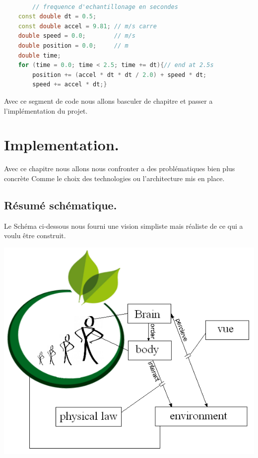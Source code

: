 \documentclass[a4paper,11pt]{article}
\begin{document}
\begin{lstlisting}[language=c++, style=eclipse, frame=single]   

        // frequence d'echantillonage en secondes
    const double dt = 0.5;     	
    const double accel = 9.81; // m/s carre
    double speed = 0.0;        // m/s
    double position = 0.0;     // m
    double time;
    for (time = 0.0; time < 2.5; time += dt){// end at 2.5s
        position += (accel * dt * dt / 2.0) + speed * dt;
        speed += accel * dt;} 
\end{lstlisting}

\vspace{0.25cm}

Avec ce segment de code nous allons basculer de chapitre et passer a l'implémentation du projet.

\newpage

\section{Implementation.}

Avec ce chapitre nous allons nous confronter a des problématiques bien plus concrète Comme le choix des technologies ou l'architecture mis en place.

\subsection{Résumé schématique.}

Le Schéma ci-dessous nous fourni une vision simpliste mais réaliste de ce qui a voulu être construit. 

\includegraphics[width=\textwidth]{ModelConcetuel.PNG}
\end{document}

